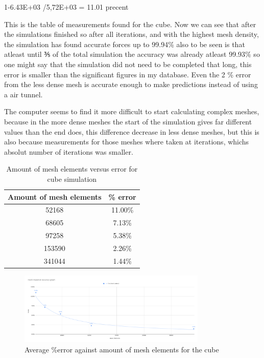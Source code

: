 \documentclass[12pt,a4paper]{article}
\begin{document}
1-6.43E+03 /5,72E+03 = 11.01 precent

This is the table of measurements found for the cube. Now we can see that  after the simulations finished so after all iterations, and with the highest mesh density, the simulation has found accurate forces up to 99.94\% also to be seen is that atleast until ⅗ of the total simulation the accuracy was already atleast 99.93\% so one might say that the simulation did not need to be completed that long, this error is smaller than the significant figures in my database. Even the 2 \% error from the less dense mesh is accurate enough to make predictions instead of using a air tunnel. 

The computer seems to find it more difficult to start calculating complex meshes, because in the more dense meshes the start of the simulation gives far different values than the end does, this difference decrease in less dense meshes, but this is also because measurements for those meshes where taken at iterations, whichs absolut number of iterations was smaller.

\begin{table}[H]
\centering
\caption{Amount of mesh elements versus error for cube simulation}
\label{tab:cube_elements_error}
\begin{tabular}{|c|c|}
\hline
\rowcolor{lightblue}
\textbf{Amount of mesh elements} & \textbf{\% error} \\
\hline
52168 & 11.00\% \\
\hline
68605 & 7.13\% \\
\hline
97258 & 5.38\% \\
\hline
153590 & 2.26\% \\
\hline
341044 & 1.44\% \\
\hline
\end{tabular}
\end{table}

\begin{figure}[H]
\centering
\includegraphics[width=0.8\textwidth]{image12.png}
\caption{Average \%error against amount of mesh elements for the cube}
\label{fig:cube_elements_error}
\end{figure}
\end{document}
